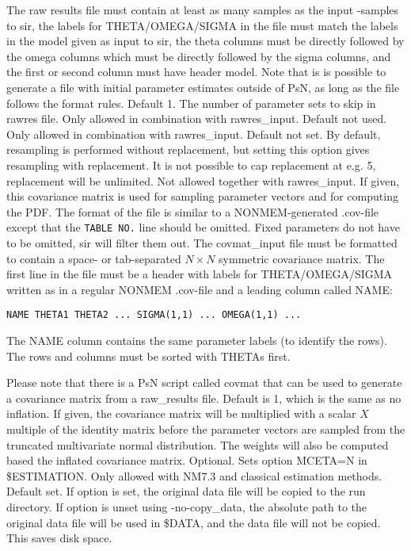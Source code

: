 \begin{optionlist}
The raw results file must contain at least as many 
samples as the input -samples to sir, the labels for  THETA/OMEGA/SIGMA 
in the file must match the labels in the model given as input 
to sir, the theta columns must be directly followed by the omega columns 
which must be directly followed by the sigma columns, and the first or
second column must have header model. Note that is is 
possible to generate a file with initial parameter estimates outside 
of PsN, as long as the file follows the format rules.
\nextopt
{}
Default 1. The number of parameter sets to skip in rawres file. Only allowed in combination with rawres\_input.
\nextopt
{}
Default not used. Only allowed in combination with rawres\_input.
\nextopt
{}
Default not set. By default, resampling is performed without replacement, but setting this option gives resampling with replacement.
It is not possible to cap replacement at e.g. 5, replacement will be unlimited.
\nextopt
{}
Not allowed together with rawres\_input. If given, this covariance matrix is
used for sampling parameter vectors and for computing the PDF. 
The format of the file is similar to a NONMEM-generated .cov-file except 
that the \verb|TABLE NO.| line should be omitted.
Fixed parameters do not have to be omitted, sir will filter them out. 
The covmat\_input file must be formatted to contain a space- or tab-separated  $N\times N$ symmetric covariance matrix.
The first line in the file must be a header with labels for THETA/OMEGA/SIGMA written as in a regular NONMEM .cov-file 
and a leading column called NAME: 
\begin{verbatim}
NAME THETA1 THETA2 ... SIGMA(1,1) ... OMEGA(1,1) ... 
\end{verbatim}
The NAME column contains the same parameter labels (to identify the rows).
The rows and columns must be sorted with THETAs first.

Please note that there is a PsN script called covmat that can be used to generate a covariance matrix from a raw\_results file.
\nextopt
{}
Default is 1, which is the same as no inflation. If given, the covariance
matrix will be multiplied with a scalar $X$ multiple of the identity matrix
before the parameter vectors
are sampled from the truncated multivariate normal distribution.
The weights will also be computed based the inflated covariance matrix. 
\nextopt
{}
Optional. Sets option MCETA=N in \$ESTIMATION. Only allowed with NM7.3 and classical estimation methods.
\nextopt
{}
Default set. If option is set, the original data file
will be copied to the run directory.
If option is unset using -no-copy\_data, the absolute path to the original data file will be used in
\$DATA, and the data file will not be copied. This saves disk space.
\nextopt
\end{optionlist}


